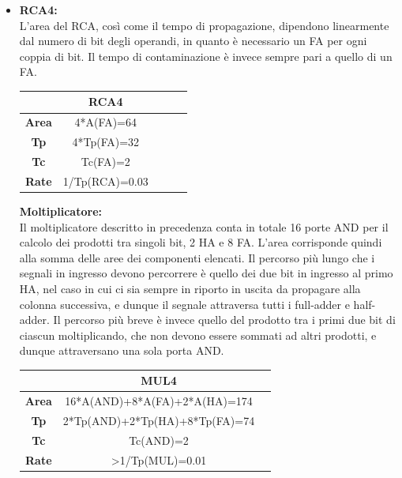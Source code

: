 \documentclass[10pt]{article}
\begin{document}
\begin{itemize}
\begin{itemize}
\item \textbf{RCA4:}\\
    L'area del RCA, così come il tempo di propagazione, dipendono linearmente dal numero di bit degli operandi, in quanto è necessario un FA per ogni coppia di bit. 
    Il tempo di contaminazione è invece sempre pari a quello di un FA.

    \begin{table}[H]
        \begin{minipage}[c]{\textwidth}
        \centering
        \begin{tabular}{|c|c|c|c|c|}
        \hline
                      & \textbf{RCA4}  \\ \hline
        \textbf{Area} & 4*A(FA)=64     \\ 
        \textbf{Tp}   & 4*Tp(FA)=32    \\ 
        \textbf{Tc}   & Tc(FA)=2       \\ 
        \textbf{Rate} & 1/Tp(RCA)=0.03 \\ \hline
        \end{tabular}
    \end{minipage}
    \end{table}
    
\textbf{Moltiplicatore:}\\
Il moltiplicatore descritto in precedenza conta in totale 16 porte AND per il calcolo dei prodotti tra singoli bit, 2 HA e 8 FA. L'area corrisponde quindi alla somma delle aree dei componenti elencati.
Il percorso più lungo che i segnali in ingresso devono percorrere è quello dei due bit in ingresso al primo HA, nel caso in cui ci sia sempre in riporto in uscita da propagare alla colonna successiva,
e dunque il segnale attraversa tutti i full-adder e half-adder.
Il percorso più breve è invece quello del prodotto tra i primi due bit di ciascun moltiplicando, che non devono essere sommati ad altri prodotti, e dunque attraversano una sola porta AND.

\begin{table}[H]
    \begin{minipage}[c]{\textwidth}
    \centering
    \begin{tabular}{|c|c|c|}
    \hline
                  & \textbf{MUL4}                   \\ \hline
    \textbf{Area} & 16*A(AND)+8*A(FA)+2*A(HA)=174   \\ 
    \textbf{Tp}   & 2*Tp(AND)+2*Tp(HA)+8*Tp(FA)=74  \\ 
    \textbf{Tc}   & Tc(AND)=2                       \\ 
    \textbf{Rate} & >1/Tp(MUL)=0.01                 \\ \hline
    \end{tabular}
\end{minipage}
\end{table}
\end{itemize}


\end{itemize}
\end{document}
